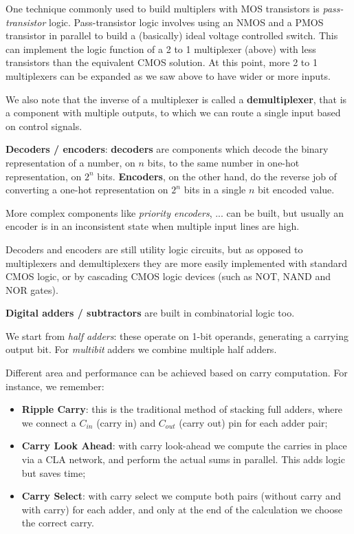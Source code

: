 \documentclass[a4paper,11pt]{article}
\begin{document}
\par\smallskip

One technique commonly used to build multiplers with MOS transistors is \textit{pass-transistor} logic.
Pass-transistor logic involves using an NMOS and a PMOS transistor in parallel to build a (basically) ideal voltage controlled switch. This can implement the logic function of a 2 to 1 multiplexer (above) with less transistors than the equivalent CMOS solution.
At this point, more 2 to 1 multiplexers can be expanded as we saw above to have wider or more inputs.

\par\smallskip

We also note that the inverse of a multiplexer is called a \textbf{demultiplexer}, that is a component with multiple outputs, to which we can route a single input based on control signals.

\textbf{\textsf{Decoders / encoders}}: \textbf{decoders} are components which decode the binary representation of a number, on $n$ bits, to the same number in one-hot representation, on $2^n$ bits.
\textbf{Encoders}, on the other hand, do the reverse job of converting a one-hot representation on $2^n$ bits in a single $n$ bit encoded value.

More complex components like \textit{priority encoders}, ... can be built, but usually an encoder is in an inconsistent state when multiple input lines are high.

Decoders and encoders are still utility logic circuits, but as opposed to multiplexers and demultiplexers they are more easily implemented with standard CMOS logic, or by cascading CMOS logic devices (such as NOT, NAND and NOR gates).

\textbf{\textsf{Digital adders / subtractors}} are built in combinatorial logic too.

We start from \textit{half adders}: these operate on 1-bit operands, generating a carrying output bit.
For \textit{multibit} adders we combine multiple half adders.

Different area and performance can be achieved based on carry computation.
For instance, we remember:
\begin{itemize}
	\item \textbf{Ripple Carry}: this is the traditional method of stacking full adders, where we connect a $C_{in}$ (carry in) and $C_{out}$ (carry out) pin for each adder pair;
	\item \textbf{Carry Look Ahead}: with carry look-ahead we compute the carries in place via a CLA network, and perform the actual sums in parallel. This adds logic but saves time;
	\item \textbf{Carry Select}: with carry select we compute both pairs (without carry and with carry) for each adder, and only at the end of the calculation we choose the correct carry.
\end{itemize}
\end{document}
